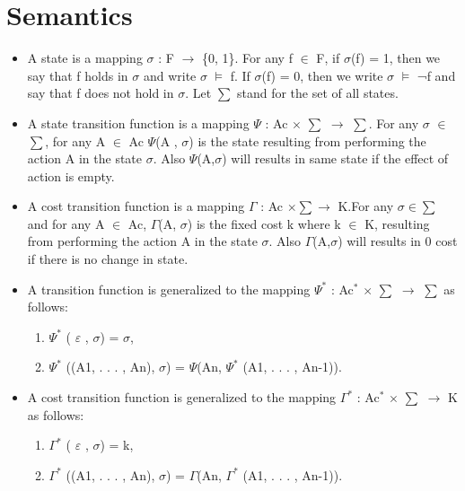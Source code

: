 \documentclass[11pt]{article}
\begin{document}
	\section{Semantics}
	\begin{itemize}
\item 	A state is a mapping $\sigma$ : F $\rightarrow$ \{0, 1\}. For any f $\in$ F, if $\sigma$(f) = 1, then we say that f holds in $\sigma$ and write $\sigma$   $\vDash$   f. If $\sigma$(f) = 0, then we write $\sigma$   $\vDash$   ¬f and say that f does not hold in $\sigma$. Let $\sum$ stand for the set of all states.

\item 	A state transition function is a mapping $\Psi$ : Ac $\times$ $\sum$ $\rightarrow$ $\sum$. For any $\sigma$ $\in$ $\sum$, for any A $\in$ Ac $\Psi$(A , $\sigma$) is the state resulting from performing the action A in the state $\sigma$. Also $\Psi$(A,$\sigma$) will results in same state if the effect of action is empty.

\item A cost transition function is a mapping $\Gamma$ : Ac $\times \sum \rightarrow$ K.For any $\sigma\in\sum$ and for any A $\in$ Ac, $\Gamma$(A, $\sigma$) is the fixed cost k where k $\in$ K, resulting from performing the action A in the state $\sigma$. Also $\Gamma$(A,$\sigma$) will results in 0 cost if there is no change in state. 


\item 	A transition function is generalized to the mapping $\Psi^{\ast}$ : Ac$^{\ast}$  $\times$  $\sum$ $\rightarrow$ $\sum$ as follows: 
\begin{enumerate}

\item $\Psi^{\ast}$ ( $\varepsilon$ , $\sigma$) = $\sigma$,
 
\item $\Psi^{\ast}$ ((A1, . . . , An), $\sigma$) = $\Psi$(An, $\Psi^{\ast}$ (A1, . . . , An-1)). 

\end{enumerate}
 
\item A cost transition function is generalized to the mapping $\Gamma^{\ast}$ : Ac$^{\ast}$  $\times$  $\sum$ $\rightarrow$ K as follows: 
\begin{enumerate}

\item $\Gamma^{\ast}$ ( $\varepsilon$ , $\sigma$) = k,
 
\item $\Gamma^{\ast}$ ((A1, . . . , An), $\sigma$) = $\Gamma$(An, $\Gamma^{\ast}$ (A1, . . . , An-1)). 


\end{enumerate}
\end{itemize}
\end{document}
